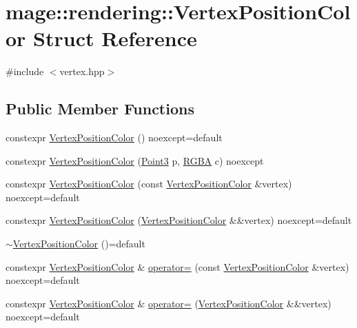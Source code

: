 \hypertarget{structmage_1_1rendering_1_1_vertex_position_color}{}\section{mage\+:\+:rendering\+:\+:Vertex\+Position\+Color Struct Reference}
\label{structmage_1_1rendering_1_1_vertex_position_color}


{\ttfamily \#include $<$vertex.\+hpp$>$}

\subsection*{Public Member Functions}
\begin{DoxyCompactItemize}
\item 
constexpr \mbox{\hyperlink{structmage_1_1rendering_1_1_vertex_position_color_a2491463aecd8969ed33f85b41a0887c5}{Vertex\+Position\+Color}} () noexcept=default
\item 
constexpr \mbox{\hyperlink{structmage_1_1rendering_1_1_vertex_position_color_aee4b12660a3966ebbaf8235eadf0295a}{Vertex\+Position\+Color}} (\mbox{\hyperlink{structmage_1_1_point3}{Point3}} p, \mbox{\hyperlink{structmage_1_1_r_g_b_a}{R\+G\+BA}} c) noexcept
\item 
constexpr \mbox{\hyperlink{structmage_1_1rendering_1_1_vertex_position_color_a4722da066079b70dea70bf892b0652ad}{Vertex\+Position\+Color}} (const \mbox{\hyperlink{structmage_1_1rendering_1_1_vertex_position_color}{Vertex\+Position\+Color}} \&vertex) noexcept=default
\item 
constexpr \mbox{\hyperlink{structmage_1_1rendering_1_1_vertex_position_color_a28e3b4bc9f98e805fc2bfd0553876e15}{Vertex\+Position\+Color}} (\mbox{\hyperlink{structmage_1_1rendering_1_1_vertex_position_color}{Vertex\+Position\+Color}} \&\&vertex) noexcept=default
\item 
\mbox{\hyperlink{structmage_1_1rendering_1_1_vertex_position_color_a80120768659e011119843c29df379e13}{$\sim$\+Vertex\+Position\+Color}} ()=default
\item 
constexpr \mbox{\hyperlink{structmage_1_1rendering_1_1_vertex_position_color}{Vertex\+Position\+Color}} \& \mbox{\hyperlink{structmage_1_1rendering_1_1_vertex_position_color_a8fd53bb8cda2b18504a7dfd386e78463}{operator=}} (const \mbox{\hyperlink{structmage_1_1rendering_1_1_vertex_position_color}{Vertex\+Position\+Color}} \&vertex) noexcept=default
\item 
constexpr \mbox{\hyperlink{structmage_1_1rendering_1_1_vertex_position_color}{Vertex\+Position\+Color}} \& \mbox{\hyperlink{structmage_1_1rendering_1_1_vertex_position_color_afd66f27ff1c0a372f729960260b4decd}{operator=}} (\mbox{\hyperlink{structmage_1_1rendering_1_1_vertex_position_color}{Vertex\+Position\+Color}} \&\&vertex) noexcept=default
\end{DoxyCompactItemize}
